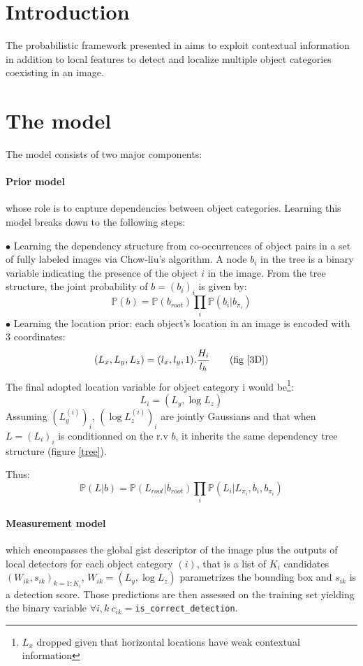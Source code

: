 \documentclass[11pt]{article}
\newcommand{\p}{\mathbb{P}}
\begin{document}
\begin{multicols}{2}
\section*{Introduction}
The probabilistic framework presented in \cite{htree} aims to exploit contextual information in addition to local features to detect and localize multiple object categories coexisting in an image.
\section*{The model}
The model consists of two major components:
\paragraph*{Prior model} whose role is to capture dependencies between object categories. Learning this model breaks down to the following steps:

$\bullet$ Learning the dependency structure from co-occurrences of object pairs in a set of fully labeled images via Chow-liu's algorithm\cite{chowliu}.
A node $b_i$ in the tree is a binary variable indicating the presence of the object $i$ in the image.
From the tree structure, the joint probability of $b=(b_i)_i$ is given by:
\[\p(b)=\p(b_{root})\prod_i\p(b_i|b_{\pi_i})\]
$\bullet$ Learning the location prior: each object's location in an image is encoded with 3 coordinates\cite{3D}:
\[(L_x,L_y,L_z)=(l_x,l_y,1).\frac{H_i}{l_h}\tag{fig \ref{3D}}\]
The final adopted location variable for object category i would be\footnote{$L_x$ dropped given that horizontal locations have weak contextual information}:
\[L_i=(L_y,\log L_z)\]
Assuming $(L_y^{(i)})_i$, $(\log L_z^{(i)})_i$ are jointly Gaussians and that when $L=(L_i)_i$ is conditionned on the r.v $b$, it inherits the same dependency tree structure (figure \ref{tree}). 

Thus:
\[\p(L|b)=\p(L_{root}|b_{root})\prod_i\p(L_i|L_{\pi_i},b_i,b_{\pi_i})\] 
\paragraph*{Measurement model} which encompasses the global gist descriptor \cite{gist} of the image plus the outputs of local detectors for each object category $(i)$, that is a list of $K_i$ candidates $(W_{ik},s_{ik})_{k=1:K_i}$, $W_{ik}=(L_y,\log L_z)$ parametrizes the bounding box and $s_{ik}$ is a detection score. Those predictions are then assessed on the training set yielding the binary variable $\forall i,k\:c_{ik}=$\texttt{is\_correct\_detection}.

\end{multicols}
\end{document}
